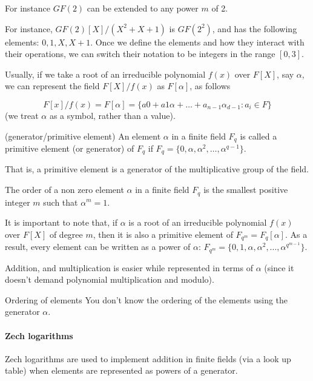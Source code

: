 For instance $GF(2)$ can be extended to any power $m$ of 2.

For instance, $GF(2)[X]/(X^2+X+1)$ is $GF(2^2)$, and has the following elements:
$0,1,X,X+1$. Once we define the elements and how they interact with their operations, we can 
switch their notation to be integers in the range $[0,3]$. 

\begin{remark}
    Usually,  if we take a root of an irreducible
    polynomial $f(x)$ over $F[X]$, say $\alpha$, we can 
    represent the field $F[X]/f(x)$ as $F[\alpha]$, as follows
    
    $$F[x]/f(x)=F[\alpha]= \{a0 + a1 \alpha + \dots + a_{n-1} \alpha_{d-1} : a_i \in F\}$$
    (we treat $\alpha$ as a symbol, rather than a value). 
\end{remark}


\begin{definition}(generator/primitive element)
    An element $\alpha$ in a finite field $F_q$ is called a primitive element
    (or generator) of $F_q$ if 
    $F_q = \{0, \alpha, \alpha^2, \dots , \alpha^{q-1}\}$.
\end{definition}
That is, a primitive element is a generator 
of the multiplicative group of the field.

\begin{definition}
    The order of a non zero element $\alpha$ in a finite field $F_q$ 
    is the smallest positive integer $m$ such that
    $\alpha^m=1$.
\end{definition}


It is important to note that, if $\alpha$ is a 
root of an irreducible polynomial $f(x)$ over $F[X]$ of degree $m$, 
then it is also a primitive element of $F_{q^m}=F_q[\alpha]$.
As a result, every element can be written as a power of $\alpha$: 
$F_{q^m}=\{0,1,\alpha,\alpha^2,\dots,\alpha^{q^{m-1}}\}$.

Addition, and multiplication is easier while represented in terms of $\alpha$ 
(since it doesn't demand polynomial multiplication and modulo).

\begin{bclogo}[logo=\bcinfo, couleurBarre=orange, noborder=true, couleur=white]{Ordering of elements}
    You don't know the ordering of the elements using the generator $\alpha$.
\end{bclogo}

\paragraph{Zech logarithms}
Zech logarithms are used to implement addition in finite fields 
(via a look up table)
when elements are represented as powers of a generator. 

